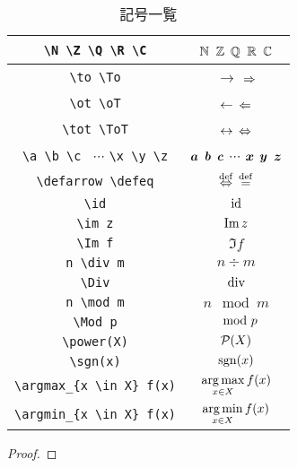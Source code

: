 \documentclass[twocolumn]{jsarticle}
\begin{document}
\begin{table}[ht]
\caption{記号一覧}
\centering
\begin{tabular}{|c|c|}\hline
\verb|\N \Z \Q \R \C| & $\mathbb{N}$ $\mathbb{Z}$ $\mathbb{Q}$ $\mathbb{R}$ $\mathbb{C}$\\ \hline
\verb|\to \To| & $\to$ $\Rightarrow$\\ \hline
\verb|\ot \oT| & $\leftarrow$ $\Leftarrow$\\ \hline
\verb|\tot \ToT| & $\leftrightarrow$ $\Leftrightarrow$\\ \hline
\verb|\a \b \c | $\cdots$ \verb|\x \y \z|  & $\bm{a}$ $\bm{b}$ $\bm{c}$ $\cdots$ $\bm{x}$ $\bm{y}$ $\bm{z}$\\ \hline
\verb|\defarrow \defeq| & $\overset{\operatorname{def}}{\Leftrightarrow}$ $\overset{\operatorname{def}}{=}$\\ \hline
\verb|\id| & $\operatorname{id}$\\ \hline
\verb|\im z| & $\im z$\\ \hline
\verb|\Im f| & $\Im f$\\ \hline
\verb|n \div m| & $n \div m$\\ \hline
\verb|\Div| & $\Div$\\ \hline
\verb|n \mod m| & $n \mod m$\\ \hline
\verb|\Mod p| & $\mod p$\\ \hline
\verb|\power(X)| & $\mathcal{P}(X)$\\ \hline
\verb|\sgn(x)| & $\operatorname{sgn}(x)$\\ \hline
\verb|\argmax_{x \in X} f(x)| & $\mathop{\operatorname{arg\,max}}\limits_{x \in X} f(x)$\\ \hline
\verb|\argmin_{x \in X} f(x)| & $\mathop{\operatorname{arg\,min}}\limits_{x \in X} f(x)$\\ \hline
\end{tabular}
\end{table}

\begin{axiom}
\end{axiom}
\begin{definition}
\end{definition}
\begin{theorem}
\end{theorem}
\begin{lemma}
\end{lemma}
\begin{corollary}[系]
\end{corollary}
\begin{proposition}
\end{proposition}
\begin{proof}
\end{proof}
\end{document}
